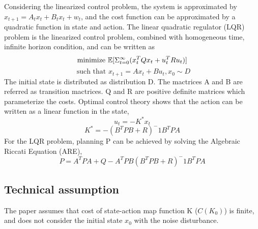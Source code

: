 Considering the linearized control problem, the system is approximated by $x_{t+1}=A_t x_t+B_t x_t+w_t$, and the cost function can be approximated by a quadratic function in state and action. The linear quadratic regulator (LQR) problem is the linearized control problem, combined with homogeneous time, infinite horizon condition, and can be written as
\begin{equation}
    \textrm{minimize }   \mathbb{E}[\Sigma_{t=0}^\infty (x_t^T Q x_t+u_t^T R u_t)]  \newline
\end{equation}\newline
\begin{equation}
    \textrm{ such that }   x_{t+1} = Ax_t+Bu_t,x_0\sim D
\end{equation}\newline
The initial state is distributed as distribution D. The mactrices A and B are referred as transition mactrices. Q and R are positive definite matrices which parameterize the costs.\newline
Optimal control theory shows that the action can be written as a linear function in the state,
\begin{equation}
    u_t=-K^* x_t
\end{equation}\newline
\begin{equation}
    K^* = -(B^T PB + R)^-1 B^T PA
\end{equation}\newline
For the LQR problem, planning P can be achieved by solving  the Algebraic Riccati Equation (ARE),
\begin{equation}
    P = A^T PA+Q-A^T PB(B^T PB+R)^-1 B^T PA
\end{equation}\newline

\subsection{Technical assumption}
The paper assumes that cost of state-action map function K ($C(K_0)$) is finite, and does not consider the initial state $x_0$  with the noise disturbance.

